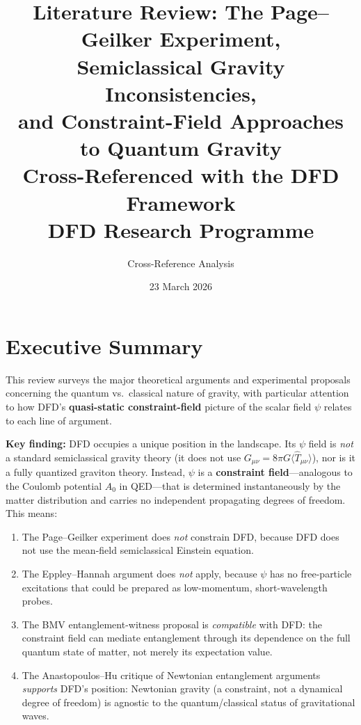 \documentclass[12pt,a4paper]{article}
\title{Literature Review: The Page--Geilker Experiment,\\
Semiclassical Gravity Inconsistencies,\\
and Constraint-Field Approaches to Quantum Gravity\\[6pt]
\large Cross-Referenced with the DFD Framework\\[6pt]
\normalsize DFD Research Programme}
\author{Cross-Reference Analysis}
\date{23 March 2026}
\begin{document}
\maketitle
\tableofcontents
\newpage

\section{Executive Summary}
\label{sec:executive}

This review surveys the major theoretical arguments and experimental proposals concerning the quantum vs.\ classical nature of gravity, with particular attention to how DFD's \textbf{quasi-static constraint-field} picture of the scalar field $\psi$ relates to each line of argument.

\textbf{Key finding:} DFD occupies a unique position in the landscape. Its $\psi$ field is \emph{not} a standard semiclassical gravity theory (it does not use $G_{\mu\nu} = 8\pi G \langle \hat{T}_{\mu\nu}\rangle$), nor is it a fully quantized graviton theory. Instead, $\psi$ is a \textbf{constraint field}---analogous to the Coulomb potential $A_0$ in QED---that is determined instantaneously by the matter distribution and carries no independent propagating degrees of freedom. This means:

\begin{enumerate}
\item The Page--Geilker experiment does \emph{not} constrain DFD, because DFD does not use the mean-field semiclassical Einstein equation.
\item The Eppley--Hannah argument does \emph{not} apply, because $\psi$ has no free-particle excitations that could be prepared as low-momentum, short-wavelength probes.
\item The BMV entanglement-witness proposal is \emph{compatible} with DFD: the constraint field can mediate entanglement through its dependence on the full quantum state of matter, not merely its expectation value.
\item The Anastopoulos--Hu critique of Newtonian entanglement arguments \emph{supports} DFD's position: Newtonian gravity (a constraint, not a dynamical degree of freedom) is agnostic to the quantum/classical status of gravitational waves.
\end{enumerate}

\end{document}
